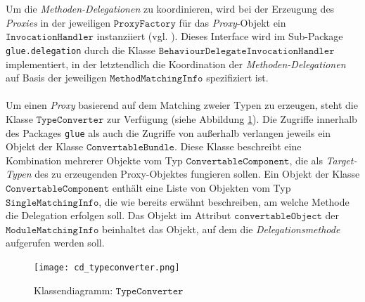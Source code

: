 \\\\
Um die \emph{Methoden-Delegationen} zu koordinieren, wird bei der Erzeugung des \emph{Proxies} in der jeweiligen $\texttt{ProxyFactory}$ für das \emph{Proxy}-Objekt ein $\texttt{InvocationHandler}$ instanziiert (vgl. \cite{invocationhandler}). Dieses \Gls{Interface} wird im Sub-Package \texttt{glue.delegation} durch die Klasse \linebreak$\texttt{BehaviourDelegateInvocationHandler}$ implementiert, in der letztendlich die Koordination der \emph{Methoden-Delegationen} auf Basis der jeweiligen $\texttt{MethodMatchingInfo}$ spezifiziert ist.
\\\\
Um einen \emph{Proxy} basierend auf dem Matching zweier Typen zu erzeugen, steht die Klasse $\texttt{TypeConverter}$ zur Verfügung (siehe Abbildung \ref{cd_typeconverter}). Die Zugriffe innerhalb des Packages \texttt{glue} als auch die Zugriffe von außerhalb verlangen jeweils ein Objekt der Klasse $\texttt{ConvertableBundle}$. Diese Klasse beschreibt eine Kombination mehrerer Objekte vom Typ $\texttt{ConvertableComponent}$, die als \emph{Target-Typen} des zu erzeugenden Proxy-Objektes fungieren sollen. Ein Objekt der Klasse $\texttt{ConvertableComponent}$ enthält eine Liste von Objekten vom Typ $\texttt{SingleMatchingInfo}$, die wie bereits erwähnt beschreiben, am welche Methode die Delegation erfolgen soll. Das Objekt im Attribut $\texttt{convertableObject}$ der $\texttt{ModuleMatchingInfo}$ beinhaltet das Objekt, auf dem die \emph{Delegationsmethode} aufgerufen werden soll.
\begin{figure}[h!]
\texttt{[image: cd\_typeconverter.png]}
\caption{Klassendiagramm: $\texttt{TypeConverter}$}
\label{cd_typeconverter}
\end{figure}

